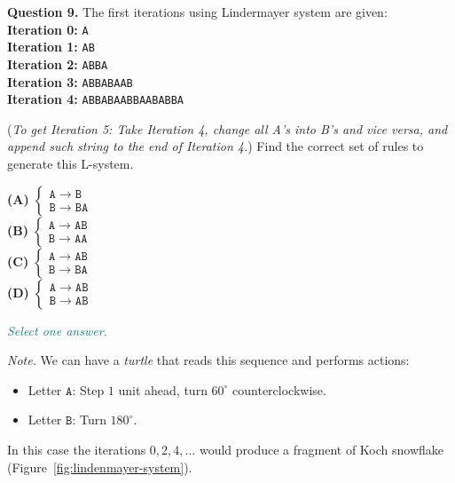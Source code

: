 \documentclass[jou]{apa6}
\begin{document}
\vspace{10pt}
{\bf Question 9.} The first iterations using Lindermayer system are given:\\
{\bf Iteration 0:} {\tt A}\\
{\bf Iteration 1:} {\tt AB}\\
{\bf Iteration 2:} {\tt ABBA}\\
{\bf Iteration 3:} {\tt ABBABAAB}\\
{\bf Iteration 4:} {\tt ABBABAABBAABABBA}

({\em To get Iteration 5: Take Iteration 4, 
change all A's into B's and
vice versa, and append such string to the end of Iteration 4.})
Find the correct set of rules to generate this L-system. 

{\bf (A)} ${\displaystyle \left\{ \begin{array}{l}
\mathtt{A} \rightarrow \mathtt{B}\\
\mathtt{B} \rightarrow \mathtt{BA}
\end{array} \right. }$\\
{\bf (B)} ${\displaystyle \left\{ \begin{array}{l}
\mathtt{A} \rightarrow \mathtt{AB}\\
\mathtt{B} \rightarrow \mathtt{AA}
\end{array} \right. }$\\
{\bf (C)} ${\displaystyle \left\{ \begin{array}{l}
\mathtt{A} \rightarrow \mathtt{AB}\\
\mathtt{B} \rightarrow \mathtt{BA}
\end{array} \right. }$\\
{\bf (D)} ${\displaystyle \left\{ \begin{array}{l}
\mathtt{A} \rightarrow \mathtt{AB}\\
\mathtt{B} \rightarrow \mathtt{AB}
\end{array} \right. }$

\textcolor{teal}{\em Select one answer.}

{\em Note.} We can have a {\em turtle} that reads this 
sequence and performs actions:
\begin{itemize}
\item Letter $\mathtt{A}$: Step $1$ unit ahead, turn 
$60^{\circ}$ counterclockwise.
\item Letter $\mathtt{B}$: Turn $180^{\circ}$. 
\end{itemize}
In this case the iterations $0,2,4,\ldots$ would produce
a fragment of Koch snowflake (Figure~\ref{fig:lindenmayer-system}).
\end{document}

